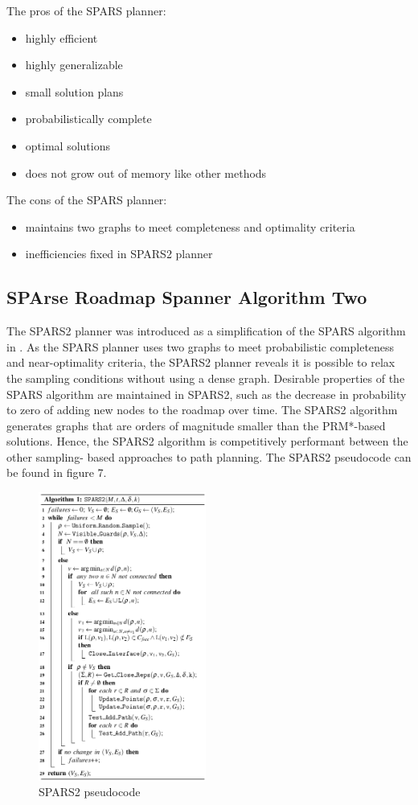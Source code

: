 \documentclass[conference]{IEEEtran} \usepackage[T1]{fontenc} \usepackage[backend=biber, style=ieee]{biblatex}
\begin{document}
The pros of the SPARS planner:
\begin{itemize}
 \item highly efficient
 \item highly generalizable
 \item small solution plans
 \item probabilistically complete
 \item optimal solutions
 \item does not grow out of memory like other methods
\end{itemize}

The cons of the SPARS planner:
\begin{itemize}
 \item maintains two graphs to meet completeness and optimality criteria
 \item inefficiencies fixed in SPARS2 planner
\end{itemize}

\subsection{SPArse Roadmap Spanner Algorithm Two} \label{SPARS2}
The SPARS2 planner was introduced as a simplification of the SPARS algorithm in \cite{spars_two}. As the SPARS planner uses two graphs to meet probabilistic 
completeness and near-optimality criteria, the SPARS2 planner reveals it is possible to relax the sampling conditions without using a dense graph. Desirable properties
of the SPARS algorithm are maintained in SPARS2, such as the decrease in probability to zero of adding new nodes to the roadmap over time. The SPARS2 algorithm
generates graphs that are orders of magnitude smaller than the PRM*-based solutions. Hence, the SPARS2 algorithm is competitively performant between the other sampling-
based approaches to path planning. The SPARS2 pseudocode can be found in figure 7.

\begin{figure}
\label{figure7} 
\centering 
\includegraphics[width=0.49\textwidth]{spars2}
\caption{SPARS2 pseudocode}
\end{figure}
\end{document}
